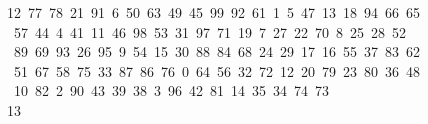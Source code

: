 \begin{tabbing}
12\ 77\ 78\ 21\ 91\ 6\ 50\ 63\ 49\ 45\ 99\ 92\ 61\ 1\ 5\ 47\ 13\ 18\ 94\ 66\ 65\ \\[0pt]
\ 57\ 44\ 4\ 41\ 11\ 46\ 98\ 53\ 31\ 97\ 71\ 19\ 7\ 27\ 22\ 70\ 8\ 25\ 28\ 52\ \\[0pt]
\ 89\ 69\ 93\ 26\ 95\ 9\ 54\ 15\ 30\ 88\ 84\ 68\ 24\ 29\ 17\ 16\ 55\ 37\ 83\ 62\\[0pt]
\>\ 51\ 67\ 58\ 75\ 33\ 87\ 86\ 76\ 0\ 64\ 56\ 32\ 72\ 12\ 20\ 79\ 23\ 80\ 36\ 48\ \\[0pt]
\ 10\ 82\ 2\ 90\ 43\ 39\ 38\ 3\ 96\ 42\ 81\ 14\ 35\ 34\ 74\ 73\\[0pt]
13\>\end{tabbing}
